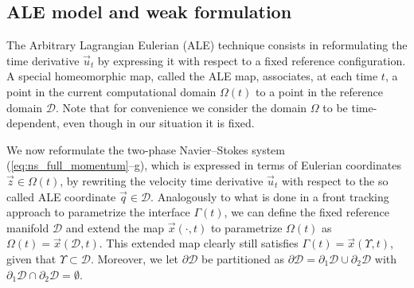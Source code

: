 \documentclass[a4paper,12pt,onecolumn]{article}
\newcommand{\D}{\mathcal D}
\begin{document}
\subsection{ALE model and weak formulation} \label{sec:ale_model}
The Arbitrary Lagrangian Eulerian (ALE) technique consists in
reformulating the time derivative $\vec u_t$ by expressing it with respect to a
fixed reference configuration. A special homeomorphic map, called the ALE map,
associates, at each time $t$, a point in the current computational domain
$\Omega(t)$ to a point in the reference domain $\D$. Note that for convenience
we consider the domain $\Omega$ to be time-dependent, even though in our
situation it is fixed.

We now reformulate the two-phase Navier--Stokes system
(\ref{eq:ns_full_momentum}--g), which is expressed in terms of Eulerian
coordinates $\vec z\in\Omega(t)$, by rewriting the velocity time derivative
$\vec u_t$ with respect to the so called ALE coordinate $\vec q \in \D$.
Analogously to what is done in a front tracking approach to parametrize the
interface $\Gamma(t)$, we can define the fixed reference manifold $\D$ and
extend the map $\vec x(\cdot,t)$ to parametrize $\Omega(t)$ as
$\Omega(t)=\vec x(\D,t)$. This extended map clearly still satisfies $\Gamma(t)
= \vec x(\Upsilon,t)$, given that $\Upsilon\subset\D$. Moreover, we let
$\partial\D$ be partitioned as $\partial\D=\partial_1\D \cup \partial_2\D$
with $\partial_1\D \cap \partial_2\D = \emptyset$.
\end{document}
